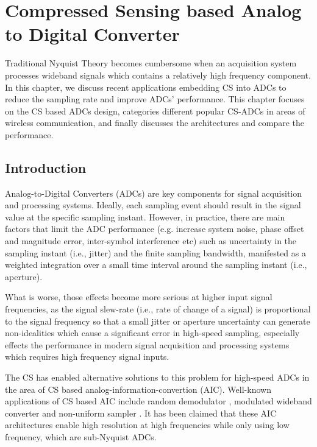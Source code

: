\chapter{Compressed Sensing based Analog to Digital Converter}\label{C:cs-adc}

Traditional Nyquist Theory becomes cumbersome when an acquisition system processes wideband signals which contains a relatively high frequency component. In this chapter, we discuss  recent applications embedding CS into ADCs to reduce the sampling rate and improve ADCs’ performance. This chapter focuses on the CS based ADCs design, categories different popular CS-ADCs in areas of wireless communication, and finally discusses the architectures and compare the performance.

\section{Introduction}\label{ch3:intro}

Analog-to-Digital Converters (ADCs) are key components for signal acquisition and processing systems.
Ideally, each sampling event should result in the signal value at the specific sampling instant. However, in practice, there are main factors that limit the ADC performance (e.g. increase system noise, phase offset and magnitude error, inter-symbol interference etc) such as uncertainty in the sampling instant (i.e., jitter) and the finite sampling bandwidth, manifested as a weighted integration over a small time interval around the sampling instant (i.e., aperture).

What is worse, those effects become more serious at higher input signal frequencies, as the signal slew-rate (i.e., rate of change of a signal) is proportional to the signal frequency so that a small jitter or aperture uncertainty can generate non-idealities which cause a significant error in high-speed sampling, especially effects the performance in modern signal acquisition and processing systems which requires high frequency signal inputs.

The CS has enabled alternative solutions to this problem for high-speed ADCs in the area of CS based analog-information-convertion (AIC). Well-known applications of CS based AIC include random demodulator \cite{tropp2010beyond}, modulated wideband converter \cite{mishali2009blind} and non-uniform sampler \cite{ ragheb2007implementation}. It has been claimed that these AIC architectures enable high resolution at high frequencies while only using low frequency, which are sub-Nyquist ADCs. 

